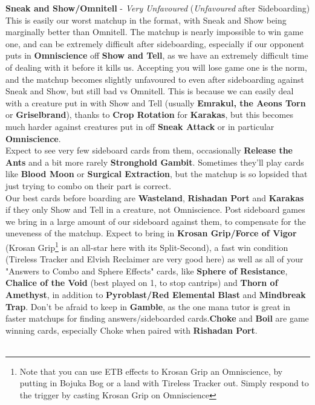 \documentclass{report}
\begin{document}
\textbf{Sneak and Show/Omnitell} - \emph{Very Unfavoured} (\emph{Unfavoured} after Sideboarding)\\
This is easily our worst matchup in the format, with Sneak and Show being marginally better than Omnitell. The matchup is nearly impossible to win game one, and can be extremely difficult after sideboarding, especially if our opponent puts in \textbf{Omniscience} off \textbf{Show and Tell}, as we have an extremely difficult time of dealing with it before it kills us. Accepting you will lose game one is the norm, and the matchup becomes slightly unfavoured to even after sideboarding against Sneak and Show, but still bad vs Omnitell. This is because we can easily deal with a creature put in with Show and Tell (usually \textbf{Emrakul, the Aeons Torn} or \textbf{Griselbrand}), thanks to \textbf{Crop Rotation} for \textbf{Karakas}, but this becomes much harder against creatures put in off \textbf{Sneak Attack} or in particular \textbf{Omniscience}.\\
Expect to see very few sideboard cards from them, occasionally \textbf{Release the Ants} and a bit more rarely \textbf{Stronghold Gambit}. Sometimes they'll play cards like \textbf{Blood Moon} or \textbf{Surgical Extraction}, but the matchup is so lopsided that just trying to combo on their part is correct.\\ Our best cards before boarding are \textbf{Wasteland}, \textbf{Rishadan Port} and \textbf{Karakas} if they only Show and Tell in a creature, not Omniscience. Post sideboard games we bring in a large amount of our sideboard against them, to compensate for the uneveness of the matchup. Expect to bring in \textbf{Krosan Grip/Force of Vigor} (Krosan Grip\footnote{Note that you can use ETB effects to Krosan Grip an Omniscience, by putting in Bojuka Bog or a land with Tireless Tracker out. Simply respond to the trigger by casting Krosan Grip on Omniscience} is an all-star here with its Split-Second), a fast win condition (Tireless Tracker and Elvish Reclaimer are very good here) as well as all of your "Answers to Combo and Sphere Effects" cards, like \textbf{Sphere of Resistance}, \textbf{Chalice of the Void} (best played on 1, to stop cantrips) and \textbf{Thorn of Amethyst}, in addition to \textbf{Pyroblast/Red Elemental Blast} and \textbf{Mindbreak Trap}. Don't be afraid to keep in \textbf{Gamble}, as the one mana tutor is great in faster matchups for finding answers/sideboarded cards.\textbf{Choke} and \textbf{Boil} are game winning cards, especially Choke when paired with \textbf{Rishadan Port}.\\\\
\end{document}
